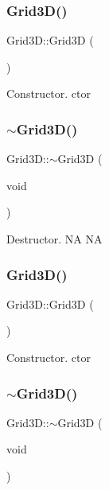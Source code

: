 \subsubsection{\texorpdfstring{Grid3\+D()}{Grid3D()}\hspace{0.1cm}{\footnotesize\ttfamily [1/2]}}
{\footnotesize\ttfamily Grid3\+D\+::\+Grid3D (\begin{DoxyParamCaption}{ }\end{DoxyParamCaption})}

Constructor.  ctor \mbox{\label{classGrid3D_a84b24f5cd01d2150dd8771b1dac7070a}} 
\subsubsection{\texorpdfstring{$\sim$\+Grid3\+D()}{~Grid3D()}\hspace{0.1cm}{\footnotesize\ttfamily [1/2]}}
{\footnotesize\ttfamily Grid3\+D\+::$\sim$\+Grid3D (\begin{DoxyParamCaption}\item[{void}]{ }\end{DoxyParamCaption})}

Destructor.  NA  NA \mbox{\label{classGrid3D_acfa00d6c0229c8c03a7c6e9ff05849c7}} 
\subsubsection{\texorpdfstring{Grid3\+D()}{Grid3D()}\hspace{0.1cm}{\footnotesize\ttfamily [2/2]}}
{\footnotesize\ttfamily Grid3\+D\+::\+Grid3D (\begin{DoxyParamCaption}{ }\end{DoxyParamCaption})}

Constructor.  ctor \mbox{\label{classGrid3D_a84b24f5cd01d2150dd8771b1dac7070a}} 
\subsubsection{\texorpdfstring{$\sim$\+Grid3\+D()}{~Grid3D()}\hspace{0.1cm}{\footnotesize\ttfamily [2/2]}}
{\footnotesize\ttfamily Grid3\+D\+::$\sim$\+Grid3D (\begin{DoxyParamCaption}\item[{void}]{ }\end{DoxyParamCaption})}

